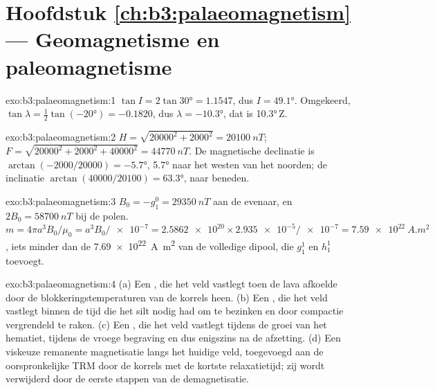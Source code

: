 \section*{Hoofdstuk \ref{ch:b3:palaeomagnetism} --- Geomagnetisme en paleomagnetisme}

\begin{solution}{exo:b3:palaeomagnetism:1}
$\tan I = 2\tan\ang{30} = 1.1547$, dus $I = \ang{49.1}$. Omgekeerd, $\tan\lambda
= \tfrac12\tan(\ang{-20}) = -0.1820$, dus $\lambda = \ang{-10.3}$, dat is
\ang{10.3}\,Z.
\end{solution}

\begin{solution}{exo:b3:palaeomagnetism:2}
$H = \sqrt{20000^2 + 2000^2} = \qty{20100}{nT}$;
$F = \sqrt{20000^2 + 2000^2 + 40000^2} = \qty{44770}{nT}$. De magnetische
declinatie is $\arctan(-2000/20000) = \ang{-5.7}$, \ang{5.7} naar het westen van het noorden;
de inclinatie $\arctan(40000/20100) = \ang{63.3}$, naar beneden.
\end{solution}

\begin{solution}{exo:b3:palaeomagnetism:3}
$B_0 = -g_1^0 = \qty{29350}{nT}$ aan de evenaar, en $2B_0 = \qty{58700}{nT}$ bij
de polen. $m = 4\pi a^3B_0/\mu_0 = a^3B_0/\num{e-7} = \num{2.5862e20}\times
\num{2.935e-5}/\num{e-7} = \qty{7.59e22}{A.m^2}$, iets minder dan de
\qty{7.69e22}{A.m^2} van de volledige dipool, die $g_1^1$ en $h_1^1$ toevoegt.
\end{solution}

\begin{solution}{exo:b3:palaeomagnetism:4}
(a) Een , die het veld vastlegt toen de lava afkoelde
door de blokkeringstemperaturen van de korrels heen. (b) Een , die het veld vastlegt binnen de tijd die het silt nodig had om te bezinken en
door compactie vergrendeld te raken. (c) Een , die het veld
vastlegt tijdens de groei van het hematiet, tijdens de vroege begraving en dus enigszins
na de afzetting. (d) Een viskeuze remanente magnetisatie langs het huidige veld, toegevoegd aan de
oorspronkelijke TRM door de korrels met de kortste relaxatietijd; zij wordt verwijderd door de
eerste stappen van de demagnetisatie.
\end{solution}

